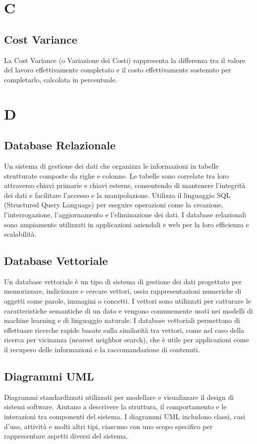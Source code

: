 \documentclass{article}
\begin{document}
\newpage
\section{C}

\subsection{Cost Variance}
La Cost Variance (o Variazione dei Costi) rappresenta la differenza tra il valore del lavoro effettivamente completato e il costo effettivamente sostenuto per completarlo, calcolata in percentuale.

\newpage

\section{D}

\subsection{Database Relazionale}
Un sistema di gestione dei dati che organizza le informazioni in tabelle strutturate composte da righe e colonne. Le tabelle sono correlate tra loro attraverso chiavi primarie e chiavi esterne, consentendo di mantenere l'integrità dei dati e facilitare l'accesso e la manipolazione. Utilizza il linguaggio SQL (Structured Query Language) per eseguire operazioni come la creazione, l'interrogazione, l'aggiornamento e l'eliminazione dei dati. I database relazionali sono ampiamente utilizzati in applicazioni aziendali e web per la loro efficienza e scalabilità.

\subsection{Database Vettoriale}
Un database vettoriale è un tipo di sistema di gestione dei dati progettato per memorizzare, indicizzare e cercare vettori, ossia rappresentazioni numeriche di oggetti come parole, immagini o concetti. I vettori sono utilizzati per catturare le caratteristiche semantiche di un dato e vengono comunemente usati nei modelli di machine learning e di linguaggio naturale. I database vettoriali permettono di effettuare ricerche rapide basate sulla similarità tra vettori, come nel caso della ricerca per vicinanza (nearest neighbor search), che è utile per applicazioni come il recupero delle informazioni e la raccomandazione di contenuti.

\subsection{Diagrammi UML}
Diagrammi standardizzati utilizzati per modellare e visualizzare il design di sistemi software. Aiutano a descrivere la struttura, il comportamento e le interazioni tra componenti del sistema. I diagrammi UML includono classi, casi d'uso, attività e molti altri tipi, ciascuno con uno scopo specifico per rappresentare aspetti diversi del sistema. 
\end{document}
